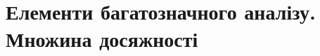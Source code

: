 \documentclass[a5paper, 10pt]{article}
\theoremstyle{definition}
\numberwithin{equation}{section}
\begin{document}
 \newpage
 \newpage
 \newpage

\section{Елементи багатозначного аналізу. Множина досяжності}

 \newpage
 \newpage
 \newpage

 \newpage
 \newpage
 \newpage

 \newpage
 \newpage
 \newpage

 \newpage
 \newpage
 \newpage

 \newpage
 \newpage
 \newpage

 \newpage
 \newpage
 \newpage

 \newpage
 \newpage
 \newpage

 \newpage
 \newpage
 \newpage

 \newpage
 \newpage

\end{document}
